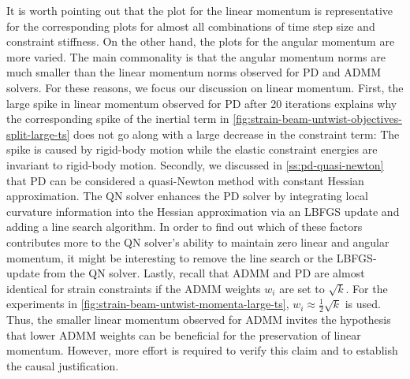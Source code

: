 It is worth pointing out that the plot for the linear momentum is representative for the corresponding plots for almost all combinations of time step size and 
constraint stiffness. On the other hand, the plots for the angular momentum are more varied. The main commonality is that the angular momentum norms are much 
smaller than the linear momentum norms observed for PD and ADMM solvers. For these reasons, we focus our discussion on linear momentum. First, the large spike 
in linear momentum observed for PD after 20 iterations explains why the corresponding spike of the inertial term in 
\autoref{fig:strain-beam-untwist-objectives-split-large-ts} does not go along with a large decrease in the constraint term: The spike is caused by rigid-body 
motion while the elastic constraint energies are invariant to rigid-body motion. Secondly, we discussed in \autoref{ss:pd-quasi-newton} that PD can be considered 
a quasi-Newton method with constant Hessian approximation. The QN solver enhances the PD solver by integrating local curvature information into the Hessian 
approximation via an LBFGS update and adding a line search algorithm. In order to find out which of these factors contributes more to the QN solver's ability to 
maintain zero linear and angular momentum, it might be interesting to remove the line search or the LBFGS-update from the QN solver. Lastly, recall that ADMM 
and PD are almost identical for strain constraints if the ADMM weights $w_i$ are set to $\sqrt{k}$. For the experiments in 
\autoref{fig:strain-beam-untwist-momenta-large-ts}, $w_i \approx \frac{1}{2}\sqrt{k}$ is used. Thus, the smaller linear momentum observed for ADMM invites 
the hypothesis that lower ADMM weights can be beneficial for the preservation of linear momentum. However, more effort is required to verify this claim and 
to establish the causal justification. 

